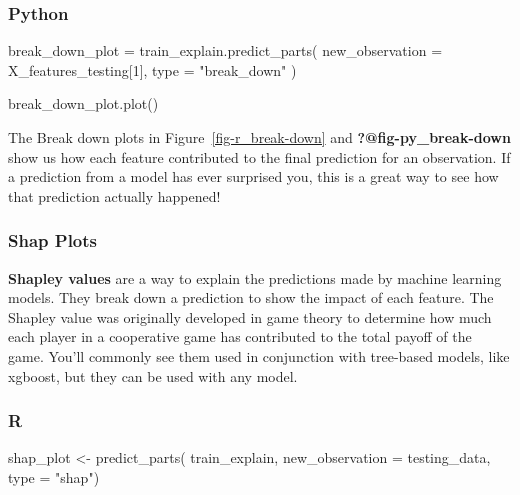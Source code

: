 \documentclass[
  letterpaper,
]{krantz}
\newenvironment{Shaded}{}{}
\newcommand{\AttributeTok}[1]{\textcolor[rgb]{0.49,0.56,0.16}{#1}}
\newcommand{\BuiltInTok}[1]{\textcolor[rgb]{0.00,0.50,0.00}{#1}}
\newcommand{\DecValTok}[1]{\textcolor[rgb]{0.25,0.63,0.44}{#1}}
\newcommand{\FunctionTok}[1]{\textcolor[rgb]{0.02,0.16,0.49}{#1}}
\newcommand{\NormalTok}[1]{#1}
\newcommand{\OperatorTok}[1]{\textcolor[rgb]{0.40,0.40,0.40}{#1}}
\newcommand{\OtherTok}[1]{\textcolor[rgb]{0.00,0.44,0.13}{#1}}
\newcommand{\StringTok}[1]{\textcolor[rgb]{0.25,0.44,0.63}{#1}}
\begin{document}
\subsubsection{Python}

\begin{Shaded}
\begin{Highlighting}[]
\NormalTok{break\_down\_plot }\OperatorTok{=}\NormalTok{ train\_explain.predict\_parts(}
\NormalTok{    new\_observation }\OperatorTok{=}\NormalTok{ X\_features\_testing[}\DecValTok{1}\NormalTok{],}
    \BuiltInTok{type} \OperatorTok{=} \StringTok{"break\_down"}
\NormalTok{)}
\end{Highlighting}
\end{Shaded}

\begin{Shaded}
\begin{Highlighting}[]
\NormalTok{break\_down\_plot.plot()}
\end{Highlighting}
\end{Shaded}

The Break down plots in Figure~\ref{fig-r_break-down} and
\textbf{?@fig-py\_break-down} show us how each feature contributed to
the final prediction for an observation. If a prediction from a model
has ever surprised you, this is a great way to see how that prediction
actually happened!

\subsubsection{Shap Plots}\label{shap-plots}

\textbf{Shapley values} are a way to explain the predictions made by
machine learning models. They break down a prediction to show the impact
of each feature. The Shapley value was originally developed in game
theory to determine how much each player in a cooperative game has
contributed to the total payoff of the game. You'll commonly see them
used in conjunction with tree-based models, like xgboost, but they can
be used with any model.

\subsubsection{R}

\begin{Shaded}
\begin{Highlighting}[]
\NormalTok{shap\_plot }\OtherTok{\textless{}{-}} \FunctionTok{predict\_parts}\NormalTok{(}
\NormalTok{  train\_explain, }
  \AttributeTok{new\_observation =}\NormalTok{ testing\_data, }
  \AttributeTok{type =} \StringTok{"shap"}\NormalTok{)}
\end{Highlighting}
\end{Shaded}
\end{document}
